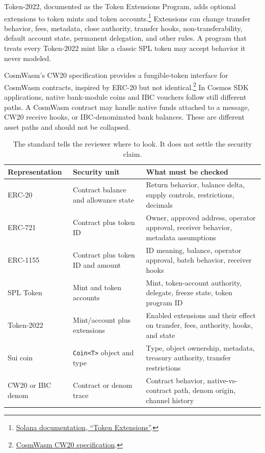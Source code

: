 Token-2022, documented as the Token Extensions Program, adds optional extensions to token mints and token accounts.\footnote{\href{https://solana.com/docs/tokens/extensions}{Solana documentation, ``Token Extensions''}.} Extensions can change transfer behavior, fees, metadata, close authority, transfer hooks, non-transferability, default account state, permanent delegation, and other rules. A program that treats every Token-2022 mint like a classic SPL token may accept behavior it never modeled.

CosmWasm's CW20 specification provides a fungible-token interface for CosmWasm contracts, inspired by ERC-20 but not identical.\footnote{\href{https://github.com/CosmWasm/cw-plus/blob/main/packages/cw20/README.md}{CosmWasm CW20 specification}.} In Cosmos SDK applications, native bank-module coins and IBC vouchers follow still different paths. A CosmWasm contract may handle native funds attached to a message, CW20 receive hooks, or IBC-denominated bank balances. These are different asset paths and should not be collapsed.

\begin{table}[htbp]
\centering
\small
\renewcommand{\arraystretch}{1.16}
\begin{tabularx}{\textwidth}{@{}>{\RaggedRight\arraybackslash}p{}>{\RaggedRight\arraybackslash}p{}X@{}}
\toprule
Representation & Security unit & What must be checked \\
\midrule
ERC-20 & Contract balance and allowance state & Return behavior, balance delta, supply controls, restrictions, decimals \\
ERC-721 & Contract plus token ID & Owner, approved address, operator approval, receiver behavior, metadata assumptions \\
ERC-1155 & Contract plus token ID and amount & ID meaning, balance, operator approval, batch behavior, receiver hooks \\
SPL Token & Mint and token accounts & Mint, token-account authority, delegate, freeze state, token program ID \\
Token-2022 & Mint/account plus extensions & Enabled extensions and their effect on transfer, fees, authority, hooks, and state \\
Sui coin & \texttt{Coin<T>} object and type & Type, object ownership, metadata, treasury authority, transfer restrictions \\
CW20 or IBC denom & Contract or denom trace & Contract behavior, native-vs-contract path, denom origin, channel history \\
\bottomrule
\end{tabularx}
\caption{The standard tells the reviewer where to look. It does not settle the security claim.}
\end{table}

